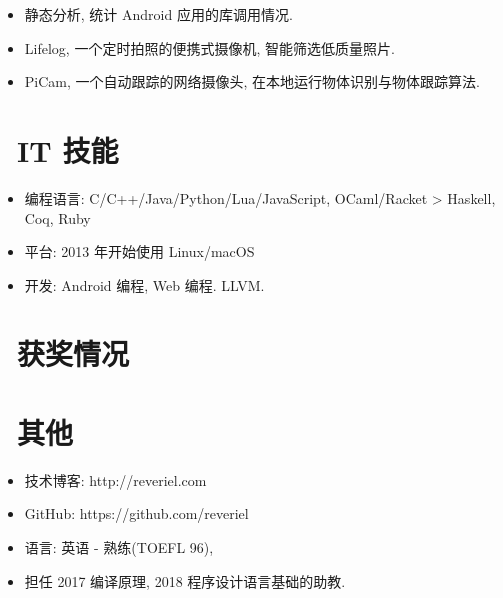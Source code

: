 \documentclass{resume}
\begin{document}
\begin{itemize}
  \item 静态分析, 统计 Android 应用的库调用情况.
\end{itemize}

\begin{itemize}
  \item Lifelog, 一个定时拍照的便携式摄像机, 智能筛选低质量照片.
  \item PiCam, 一个自动跟踪的网络摄像头, 在本地运行物体识别与物体跟踪算法.
\end{itemize}


\section{\faCogs\ IT 技能}
\begin{itemize}[parsep=0.5ex]
  \item 编程语言: C/C++/Java/Python/Lua/JavaScript, OCaml/Racket > Haskell, Coq, Ruby
  \item 平台: 2013 年开始使用 Linux/macOS
  \item 开发: Android 编程, Web 编程. LLVM.
\end{itemize}

\section{\faHeartO\ 获奖情况}

\section{\faInfo\ 其他}
\begin{itemize}[parsep=0.5ex]
  \item 技术博客: http://reveriel.com
  \item GitHub: https://github.com/reveriel
  \item 语言: 英语 - 熟练(TOEFL 96),
  \item 担任 2017 编译原理, 2018 程序设计语言基础的助教.
\end{itemize}

%
%
\end{document}
